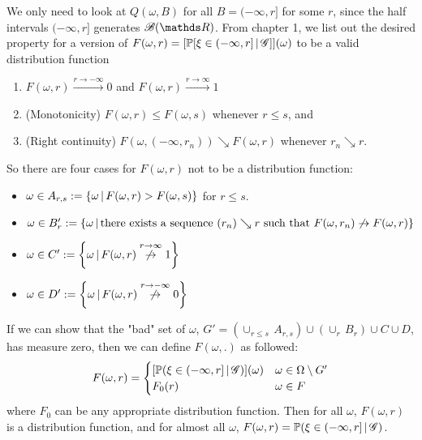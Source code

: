\begin{unexaminable}
\begin{hint}
We only need to look at $Q(\omega,B)$ for all $B = (-\infty,r]$ for some $r$, since the half intervals $(-\infty,r]$ generates $\B(\R)$. From chapter 1, we list out the desired property for a version of $F(\omega,r) = [\mathbb{P}[\xi \in (-\infty,r] \,|\, \mathcal{G}]](\omega)$ to be a valid distribution function
\begin{enumerate}
    \item $F(\omega,r) \overset{r \to -\infty}{\to} 0$ and $F(\omega,r) \overset{r \to \infty}{\to} 1$
    \item (Monotonicity) $F(\omega,r) \leq F(\omega,s)$ whenever $r \leq s$, and
    \item (Right continuity) $F(\omega, (-\infty,r_n)) \searrow F(\omega,r)$ whenever $r_n \searrow r$.
\end{enumerate}
So there are four cases for $F(\omega, r)$ not to be a distribution function:
\begin{itemize}
    \item $\omega \in A_{r,s} := \left\{ \omega \,|\, F(\omega,r) > F(\omega,s) \right \}$ for $r \leq s$.
    \item $\omega \in B_r' := \left\{ \omega \,|\, \text{there exists a sequence } (r_n) \searrow r \text{ such that } F(\omega,r_n) \not\rightarrow F(\omega,r) \right \}$
    \item $\omega \in C' := \left\{ \omega \,|\, F(\omega,r) \overset{r\to \infty}{\not\rightarrow} 1 \right \}$
    \item $\omega \in D' := \left\{ \omega \,|\, F(\omega,r) \overset{r\to -\infty}{\not\rightarrow} 0 \right \}$
\end{itemize}
If we can show that the "bad" set of $\omega$, $G' = (\cup_{r\leq s} \, A_{r,s}) \cup (\cup_r \, B_r) \cup C \cup D$, has measure zero, then we can define $F(\omega,.)$ as followed:
\begin{equation}
    F(\omega, r) = \begin{cases}
    [\mathbb{P}(\xi \in (-\infty, r] \,|\, \mathcal{G})](\omega) & \omega \in \Omega \setminus G' \\
    F_0(r) & \omega \in F
    \end{cases}
\end{equation}
where $F_0$ can be any appropriate distribution function. Then for all $\omega$, $F(\omega,r)$ is a distribution function, and for almost all $\omega$, $F(\omega,r) = \mathbb{P}(\xi \in (-\infty,r] \,|\, \mathcal{G})$. \\


\end{hint}
\end{unexaminable}
